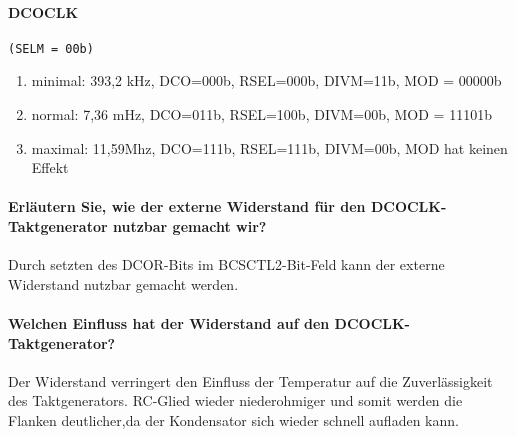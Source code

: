 \paragraph{DCOCLK} \texttt{(SELM = 00b)}
\begin{enumerate}
    \item minimal: 393,2 kHz, DCO=000b, RSEL=000b, DIVM=11b, MOD = 00000b
    \item normal: 7,36 mHz, DCO=011b, RSEL=100b, DIVM=00b, MOD = 11101b
    \item maximal: 11,59Mhz, DCO=111b, RSEL=111b, DIVM=00b, MOD hat keinen Effekt
\end{enumerate}

\paragraph{Erläutern Sie, wie der externe Widerstand für den DCOCLK-Taktgenerator nutzbar gemacht wir?}
Durch setzten des DCOR-Bits im BCSCTL2-Bit-Feld kann der externe Widerstand nutzbar gemacht werden.

\paragraph{Welchen Einfluss hat der Widerstand auf den DCOCLK-Taktgenerator?}
Der Widerstand verringert den Einfluss der Temperatur auf die Zuverlässigkeit des Taktgenerators. RC-Glied wieder niederohmiger und somit werden die Flanken deutlicher,da der Kondensator sich wieder schnell aufladen kann.

